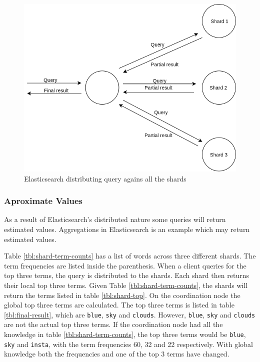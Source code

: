\begin{figure}[h]
  \centering
  \includegraphics[width=0.9\linewidth]{img/elasticsearch-sharding.png}
  \caption{Elasticsearch distributing query agains all the shards}
  \label{fig:elasticsearch-sharding}
\end{figure}

\subsubsection{Aproximate Values}
As a result of Elasticsearch's distributed nature some queries will return estimated values.
Aggregations in Elasticsearch is an example which may return estimated values.

Table \ref{tbl:shard-term-counts} has a list of words across three different shards.
The term frequencies are listed inside the parenthesis.
When a client queries for the top three terms, the query is distributed to the shards.
Each shard then returns their local top three terms.
Given Table \ref{tbl:shard-term-counts},
the shards will return the terms listed in table \ref{tbl:shard-top}.
On the coordination node the global top three terms are calculated.
The top three terms is listed in table \ref{tbl:final-result}, which are \texttt{blue}, \texttt{sky} and \texttt{clouds}.
However, \texttt{blue}, \texttt{sky} and \texttt{clouds} are not the actual top three terms.
If the coordination node had all the knowledge in table \ref{tbl:shard-term-counts},
the top three terms would be \texttt{blue}, \texttt{sky} and \texttt{insta},
with the term frequencies 60, 32 and 22 respectively.
With global knowledge both the frequencies and one of the top 3 terms have changed.

